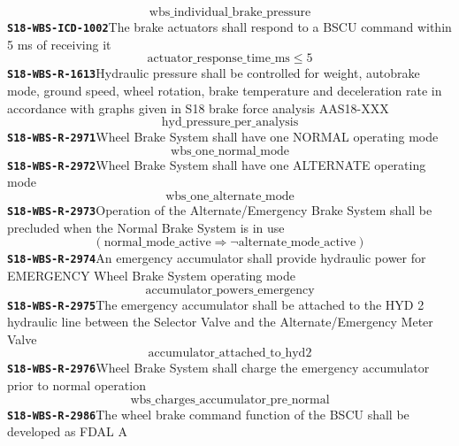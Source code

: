 \documentclass[11pt,a4paper]{article}
\begin{document}
\begin{dmath*}
\text{wbs\_individual\_brake\_pressure}
\end{dmath*}
\noindent\textbf{\texttt{S18-WBS-ICD-1002}}\quad The brake actuators shall respond to a BSCU command within 5 ms of receiving it
\begin{dmath*}
\text{actuator\_response\_time\_ms} \leq 5
\end{dmath*}
\noindent\textbf{\texttt{S18-WBS-R-1613}}\quad Hydraulic pressure shall be controlled for weight, autobrake mode, ground speed, wheel rotation, brake temperature and deceleration rate in accordance with graphs given in S18 brake force analysis AAS18-XXX
\begin{dmath*}
\text{hyd\_pressure\_per\_analysis}
\end{dmath*}
\noindent\textbf{\texttt{S18-WBS-R-2971}}\quad Wheel Brake System shall have one NORMAL operating mode
\begin{dmath*}
\text{wbs\_one\_normal\_mode}
\end{dmath*}
\noindent\textbf{\texttt{S18-WBS-R-2972}}\quad Wheel Brake System shall have one ALTERNATE operating mode
\begin{dmath*}
\text{wbs\_one\_alternate\_mode}
\end{dmath*}
\noindent\textbf{\texttt{S18-WBS-R-2973}}\quad Operation of the Alternate/Emergency Brake System shall be precluded when the Normal Brake System is in use
\begin{dmath*}
(\text{normal\_mode\_active} \Rightarrow \neg \text{alternate\_mode\_active})
\end{dmath*}
\noindent\textbf{\texttt{S18-WBS-R-2974}}\quad An emergency accumulator shall provide hydraulic power for EMERGENCY Wheel Brake System operating mode
\begin{dmath*}
\text{accumulator\_powers\_emergency}
\end{dmath*}
\noindent\textbf{\texttt{S18-WBS-R-2975}}\quad The emergency accumulator shall be attached to the HYD 2 hydraulic line between the Selector Valve and the Alternate/Emergency Meter Valve
\begin{dmath*}
\text{accumulator\_attached\_to\_hyd2}
\end{dmath*}
\noindent\textbf{\texttt{S18-WBS-R-2976}}\quad Wheel Brake System shall charge the emergency accumulator prior to normal operation
\begin{dmath*}
\text{wbs\_charges\_accumulator\_pre\_normal}
\end{dmath*}
\noindent\textbf{\texttt{S18-WBS-R-2986}}\quad The wheel brake command function of the BSCU shall be developed as FDAL A
\end{document}

